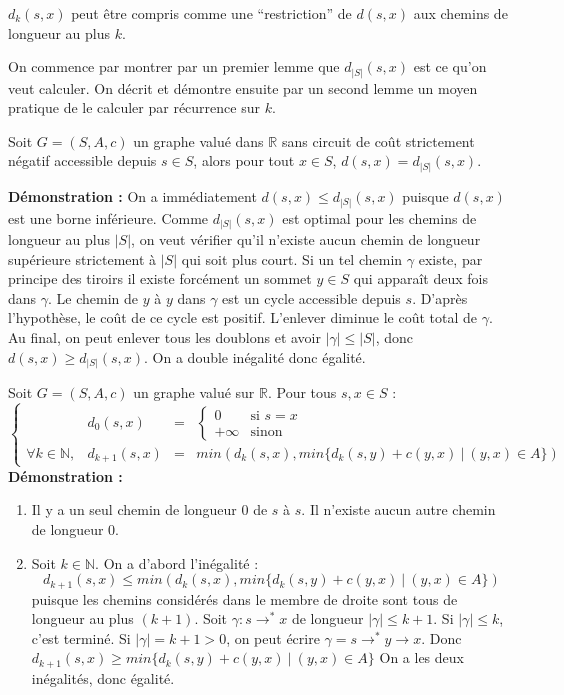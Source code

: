 \documentclass[../../../main.tex]{subfiles}
\begin{document}
$d_k(s, x)$ peut être compris comme une ``restriction'' de $d(s, x)$ aux chemins de longueur au plus $k$.

On commence par montrer par un premier lemme que $d_{|S|}(s, x)$ est ce qu'on veut calculer. On décrit
et démontre ensuite par un second lemme un moyen pratique de le calculer par récurrence sur $k$.

\lemma{} Soit $G = (S, A, c)$ un graphe valué dans $\mathbb{R}$ sans circuit de coût strictement négatif accessible
depuis $s\in S$, alors pour tout $x\in S$, $d(s, x) = d_{|S|}(s, x)$.

\textbf{Démonstration :} On a immédiatement $d(s, x)\leq d_{|S|}(s, x)$ puisque $d(s, x)$ est une borne inférieure. Comme $d_{|S|}(s, x)$ est optimal pour les chemins de longueur au plus $|S|$, on veut vérifier qu'il n'existe aucun chemin de longueur supérieure strictement
à $|S|$ qui soit plus court. Si un tel chemin $\gamma$ existe, par principe des tiroirs il existe forcément un
sommet $y\in S$ qui apparaît deux fois dans $\gamma$. Le chemin de $y$ à $y$ dans $\gamma$ est un cycle accessible depuis
$s$. D'après l'hypothèse, le coût de ce cycle est positif. L'enlever diminue le coût total de $\gamma$. Au final, on
peut enlever tous les doublons et avoir $|\gamma| \leq |S|$, donc $d(s, x)\geq d_{|S|}(s, x)$. On a double inégalité donc
égalité.

 Soit $G = (S, A, c)$ un graphe valué sur $\mathbb{R}$. Pour tous $s, x\in S$ :
$$
\left\{
\begin{array}{llcl}
& d_0 (s, x) & = & \left\{\begin{array}{ll}
0 & \text{si }s = x \\
+\infty & \text{sinon}
\end{array}\right. \\

\forall k\in \mathbb{N}, & d_{k+1}(s, x) & = & min\left(d_k(s, x), min\{d_k(s, y) + c(y, x)\ |\ (y, x)\in A\}\right)
\end{array}
\right.
$$
\textbf{Démonstration : }
\begin{enumerate}
	\item Il y a un seul chemin de longueur 0 de $s$ à $s$. Il n'existe aucun autre chemin de longueur 0.
	\item Soit $k\in\mathbb{N}$. On a d'abord l'inégalité :
$$d_{k+1}(s, x)\leq min(d_k (s, x), min\{d_k(s, y) + c(y, x)\ |\ (y, x)\in A\})$$
puisque les chemins considérés dans le membre de droite sont tous de longueur au plus $(k+1)$.\newline
Soit $\gamma : s\rightarrow^* x$ de longueur $|\gamma|\leq k + 1$. Si $|\gamma|\leq k$, c'est terminé. Si $|\gamma| = k + 1 > 0$, on peut
écrire $\gamma = s\rightarrow^* y\rightarrow x$. Donc $d_{k+1} (s, x)\geq min\{d_k (s, y) + c(y, x)\ |\ (y, x)\in A\}$\newline
On a les deux inégalités, donc égalité.
\end{enumerate}
\end{document}

